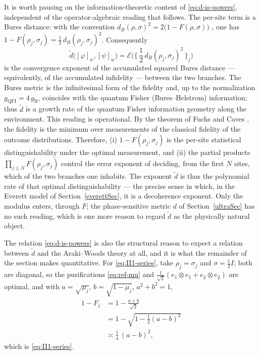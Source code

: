 \documentclass[twoside,11pt,letter]{article}
\newcommand{\cexp}{\mathcal{E}}  %
\theoremstyle{definition}
\theoremstyle{definition}
\theoremstyle{plain}
\begin{document}
It is worth pausing on the information-theoretic content of \eqref{eq:d-is-powers}, independent of the operator-algebraic reading that follows. The per-site term is a Bures distance: with the convention $d_B(\rho,\sigma)^2 = 2\bigl(1 - F(\rho,\sigma)\bigr)$ \cite{Bu69,U76}, one has $1 - F(\rho_j,\sigma_j) = \tfrac12\,d_B(\rho_j,\sigma_j)^2$. Consequently
\begin{equation}
\label{eq:d-is-bures}
\tilde d \bigl( [\varphi]_w, [\psi]_w \bigr)
= \cexp \bigl( \bigl\{\, \frac12\, d_B(\rho_j,\sigma_j)^2 \,\bigr\}_j \bigr)
\end{equation}
is the convergence exponent of the accumulated squared Bures distance --- equivalently, of the accumulated infidelity --- between the two branches. The Bures metric is the infinitesimal form of the fidelity and, up to the normalization $g_{\mathrm{QFI}} = 4\,g_{\mathrm B}$, coincides with the quantum Fisher (Bures--Helstrom) information; thus $\tilde d$ is a growth rate of the quantum Fisher information geometry along the environment. This reading is operational. By the theorem of Fuchs and Caves \cite{FC95}, the fidelity is the minimum over measurements of the classical fidelity of the outcome distributions. Therefore, (i) $1 - F(\rho_j,\sigma_j)$ is the per-site statistical distinguishability under the optimal measurement, and (ii) the partial products $\prod_{j\le N} F(\rho_j,\sigma_j)$ control the error exponent of deciding, from the first $N$ sites, which of the two branches one inhabits. The exponent $\tilde d$ is thus the polynomial rate of that optimal distinguishability --- the precise sense in which, in the Everett model of Section~\ref{everettSec}, it is a decoherence exponent. Only the modulus enters, through $F$; the phase-sensitive metric $d$ of Section~\ref{ultraSec} has no such reading, which is one more reason to regard $\tilde d$ as the physically natural object.

The relation \eqref{eq:d-is-powers} is also the structural reason to expect a relation between $\tilde d$ and the Araki--Woods theory at all, and it is what the remainder of the section makes quantitative. For \eqref{eq:II1-series}, take $\rho_j = \sigma_j$ and $\sigma = \tfrac12 I$; both are diagonal, so the purifications
\eqref{eq:ref-mu} and $\tfrac{1}{\sqrt 2}(e_1\otimes e_1 + e_2 \otimes e_2)$ are optimal, and with $a = \sqrt{\mu_j}$, $b = \sqrt{1-\mu_j}$, $a^2 + b^2 = 1$,
\begin{equation*}
\begin{split}
1 - F_j &= 1 - \frac{a+b}{\sqrt 2}\\
&= 1 - \sqrt{1 - \frac12 (a-b)^2}\\
&\asymp \frac14 \,(a-b)^2 ,
\end{split}
\end{equation*}
which is \eqref{eq:II1-series}.
\end{document}
